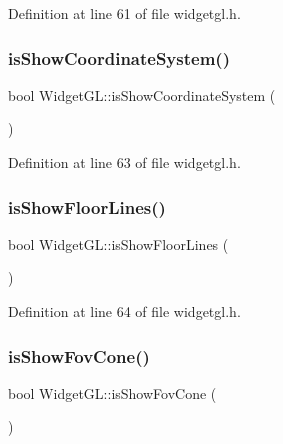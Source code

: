 Definition at line 61 of file widgetgl.\+h.

\mbox{\label{class_widget_g_l_aa3aa6bb4629f9f6c9cb9c7c1eedf72e6}} 
\subsubsection{\texorpdfstring{isShowCoordinateSystem()}{isShowCoordinateSystem()}}
{\footnotesize\ttfamily bool Widget\+G\+L\+::is\+Show\+Coordinate\+System (\begin{DoxyParamCaption}{ }\end{DoxyParamCaption})\hspace{0.3cm}{\ttfamily [inline]}}



Definition at line 63 of file widgetgl.\+h.

\mbox{\label{class_widget_g_l_a66ce6c6c40c6e977ec19cd631069e02a}} 
\subsubsection{\texorpdfstring{isShowFloorLines()}{isShowFloorLines()}}
{\footnotesize\ttfamily bool Widget\+G\+L\+::is\+Show\+Floor\+Lines (\begin{DoxyParamCaption}{ }\end{DoxyParamCaption})\hspace{0.3cm}{\ttfamily [inline]}}



Definition at line 64 of file widgetgl.\+h.

\mbox{\label{class_widget_g_l_aac60f28a3a45e6dcb14ae976b0ddec2e}} 
\subsubsection{\texorpdfstring{isShowFovCone()}{isShowFovCone()}}
{\footnotesize\ttfamily bool Widget\+G\+L\+::is\+Show\+Fov\+Cone (\begin{DoxyParamCaption}{ }\end{DoxyParamCaption})\hspace{0.3cm}{\ttfamily [inline]}}



